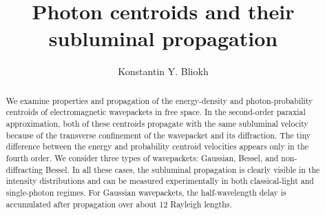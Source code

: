\documentclass[12pt, a4paper, superscriptaddress, final]{iopart}
\makeatletter
\newcommand{\mainmatter}{%
  \setcounter{footnote}{0}%
  \patchcmd{\@makefntext}{\fnsymbol}{\arabic}{}{}%
  \patchcmd{\@thefnmark}{\fnsymbol}{\arabic}{}{}%
  \def\@makefnmark{\textsuperscript{\arabic{footnote}}}%
}
\makeatother
\begin{document}

\title{Photon centroids and their subluminal propagation}

\author{Konstantin Y. Bliokh}
\address{Theoretical Quantum Physics Laboratory, Cluster for Pioneering Research, RIKEN, Wako-shi, Saitama 351-0198, Japan}
\address{Centre of Excellence ENSEMBLE3 Sp. z o.o., 01-919 Warsaw, Poland}
\address{Donostia International Physics Center (DIPC), Donostia-San Sebasti\'{a}n 20018, Spain}

\begin{abstract}
We examine properties and propagation of the energy-density and photon-probability centroids of electromagnetic wavepackets in free space. In the second-order paraxial approximation, both of these centroids propagate with the same subluminal velocity because of the transverse confinement of the wavepacket and its diffraction. The tiny difference between the energy and probability centroid velocities appears only in the fourth order. We consider three types of wavepackets: Gaussian, Bessel, and non-diffracting Bessel. In all these cases, the subluminal propagation is clearly visible in the intensity distributions and can be measured experimentally in both classical-light and single-photon regimes. For Gaussian wavepackets, the half-wavelength delay is accumulated after propagation over about 12 Rayleigh lengths.    
\end{abstract}

%
%
%
% 
%



\end{document}
